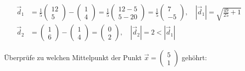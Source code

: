 \documentclass[11pt]{article}
\begin{document}
\[\begin{aligned}
\vec{d}_1 &= \frac{1}{5}\begin{pmatrix} 12 \\ 5 \end{pmatrix} -  \begin{pmatrix} 1 \\ 4 \end{pmatrix} =  \frac{1}{5} \begin{pmatrix} 12 -5 \\ 5 - 20  \end{pmatrix} = \frac{1}{5}\begin{pmatrix} 7 \\ -5 \end{pmatrix}, \quad \left| \vec{d}_1 \right| = \sqrt{\frac{49}{25} + 1}  \\
\vec{d}_2 &= \begin{pmatrix} 1 \\ 6 \end{pmatrix} -  \begin{pmatrix} 1 \\ 4 \end{pmatrix} =  \begin{pmatrix} 0 \\ 2 \end{pmatrix}, \quad \left| \vec{d}_2 \right| = 2 < \left| \vec{d}_1 \right|
\end{aligned}\]

Überprüfe zu welchen Mittelpunkt der Punkt
\(\vec{x} = \begin{pmatrix} 5 \\ 1 \end{pmatrix}\) gehöhrt:
\end{document}
